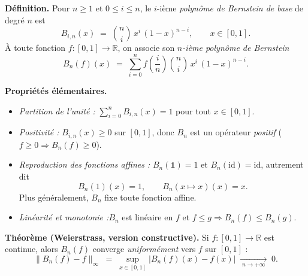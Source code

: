

\newcommand{\Bn}{B_n}
\newcommand{\Bin}{B_{i,n}}


\begin{tcolorbox}[thmbox]
  \textbf{Définition.}\enspace{}
  Pour $n \geq 1$ et $0 \leq i \leq n$, le $i$-ième \emph{polynôme de Bernstein
  de base} de degré $n$ est
  \[
    \Bin(x) \;=\; \binom{n}{i}\,x^i\,{(1-x)}^{n-i}, \qquad x \in [0,1].
  \]
  À toute fonction $f : [0,1] \to \mathbb{R}$, on associe son \emph{$n$-ième
  polynôme de Bernstein}
  \[
    \Bn(f)(x) \;=\; \sum_{i=0}^{n} f\!\left(\frac{i}{n}\right)
                    \binom{n}{i}\,x^i\,{(1-x)}^{n-i}.
  \]

  \medskip
  \textbf{Propriétés élémentaires.}
  \begin{itemize}
    \item \textit{Partition de l'unité :}\quad
          $\displaystyle\sum_{i=0}^{n} \Bin(x) = 1$ pour tout $x \in [0,1]$.
    \item \textit{Positivité :}\quad
          $\Bin(x) \geq 0$ sur $[0,1]$, donc $\Bn$ est un opérateur \emph{positif}
          ($f \geq 0 \Rightarrow \Bn(f) \geq 0$).
    \item \textit{Reproduction des fonctions affines :}\quad
          $\Bn(\mathbf{1}) = 1$ et $\Bn(\mathrm{id}) = \mathrm{id}$, autrement dit
          \[
            \Bn(1)(x) = 1, \qquad \Bn(x \mapsto x)(x) = x.
          \]
          Plus généralement, $\Bn$ fixe toute fonction affine.
    \item \textit{Linéarité et monotonie :}\quad $\Bn$ est linéaire en $f$ et
          $f \leq g \Rightarrow \Bn(f) \leq \Bn(g)$.
  \end{itemize}

  \medskip
  \textbf{Théorème (Weierstrass, version constructive).}\enspace%
  Si $f : [0,1] \to \mathbb{R}$ est continue, alors $\Bn(f)$ converge
  \emph{uniformément} vers $f$ sur $[0,1]$ :
  \[
    \bigl\| \Bn(f) - f \bigr\|_\infty
    \;=\; \sup_{x \in [0,1]} \bigl| \Bn(f)(x) - f(x) \bigr|
    \;\xrightarrow[\;n \to +\infty\;]{}\; 0.
  \]
\end{tcolorbox}

